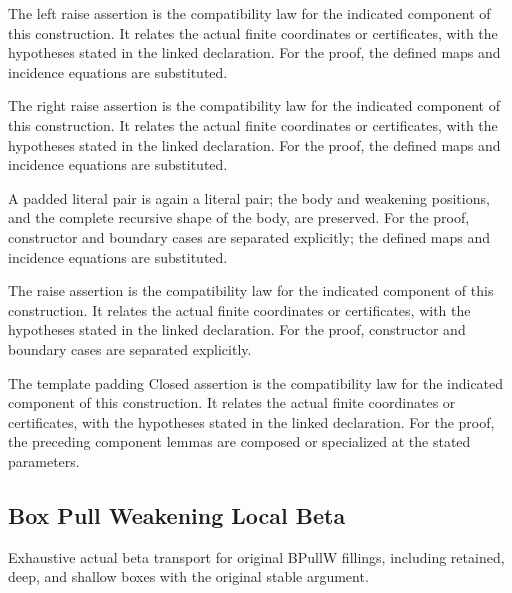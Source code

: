 The left raise assertion is the compatibility law for the indicated component of this construction. It relates the actual finite coordinates or certificates, with the hypotheses stated in the linked declaration.
For the proof, the defined maps and incidence equations are substituted.
\par{}

The right raise assertion is the compatibility law for the indicated component of this construction. It relates the actual finite coordinates or certificates, with the hypotheses stated in the linked declaration.
For the proof, the defined maps and incidence equations are substituted.
\par{}

A padded literal pair is again a literal pair; the body and weakening positions, and the complete recursive shape of the body, are preserved.
For the proof, constructor and boundary cases are separated explicitly; the defined maps and incidence equations are substituted.
\par{}

The raise assertion is the compatibility law for the indicated component of this construction. It relates the actual finite coordinates or certificates, with the hypotheses stated in the linked declaration.
For the proof, constructor and boundary cases are separated explicitly.
\par{}

The template padding Closed assertion is the compatibility law for the indicated component of this construction. It relates the actual finite coordinates or certificates, with the hypotheses stated in the linked declaration.
For the proof, the preceding component lemmas are composed or specialized at the stated parameters.
\par{}

\subsection{Box Pull Weakening Local Beta}
Exhaustive actual beta transport for original BPullW fillings, including retained, deep, and shallow boxes with the original stable argument.

